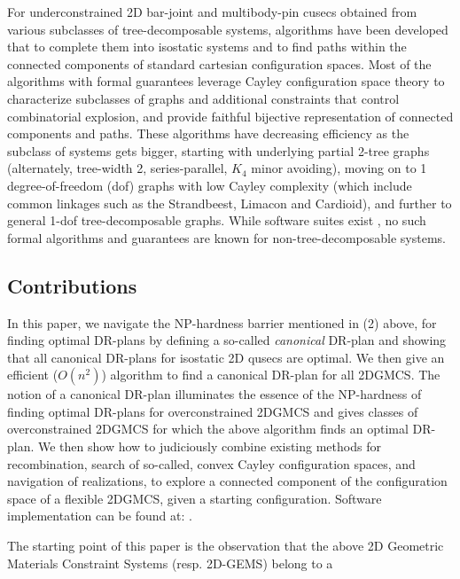  
\medskip\noindent{}
For underconstrained 2D bar-joint and multibody-pin cusecs obtained from various subclasses of tree-decomposable systems, algorithms have been developed \cite{XX, XX} that 
to complete them into isostatic systems \cite{XX, XX} and to find paths within the connected components \cite{XX,XX} of
standard cartesian configuration spaces. Most of the algorithms with formal guarantees leverage Cayley configuration space theory \cite{XX,XX}
to characterize subclasses of graphs and additional constraints that control combinatorial explosion, and provide faithful bijective representation 
of connected components and paths.
These algorithms have decreasing efficiency as the subclass of systems gets bigger, starting with
underlying partial 2-tree graphs (alternately, tree-width 2, series-parallel, $K_4$ minor avoiding),  moving on   
to 1 degree-of-freedom (dof) graphs with low Cayley complexity (which include common linkages such as the Strandbeest, Limacon and Cardioid), 
and further to general 1-dof tree-decomposable graphs. 
While software suites exist \cite{XX,XX}, no such formal algorithms and guarantees are known for non-tree-decomposable systems.


\subsection{Contributions}
\label{sec:cont}
In this paper, we  navigate the NP-hardness barrier mentioned in (2) above, for finding optimal DR-plans by defining a 
so-called {\it canonical} DR-plan and showing that all canonical DR-plans for isostatic 2D qusecs are optimal. 
We then give an efficient ($O(n^2)$) algorithm to find a canonical DR-plan for all 2DGMCS. The notion of a canonical DR-plan 
illuminates the essence of the NP-hardness of finding optimal DR-plans for overconstrained 2DGMCS and gives classes of 
overconstrained 2DGMCS for which the above  algorithm finds an optimal DR-plan. We then show how to judiciously combine 
existing methods for recombination, search of so-called, convex Cayley configuration spaces, and navigation of realizations, 
to explore a connected component of the configuration space of a flexible 2DGMCS, given a starting configuration. 
Software implementation can be found at: .

The starting point of this paper is the observation that the above 2D Geometric Materials Constraint Systems (resp. 2D-GEMS) 
belong to a  

